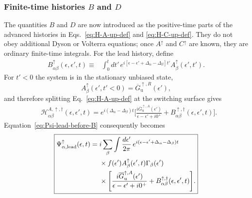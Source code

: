 \documentclass[
 reprint,
 superscriptaddress,
 amsmath,amssymb,
 aps,prb,
 longbibliography,
 floatfix
]{revtex4-2}
\begin{document}
\subsubsection{Finite-time histories $B$ and $D$}

The quantities $B$ and $D$ are now introduced as the positive-time parts of the advanced histories in Eqs.~\eqref{eq:H-A-up-def} and \eqref{eq:H-C-up-def}. They do not obey additional Dyson or Volterra equations; once $A^\uparrow$ and $C^\uparrow$ are known, they are ordinary finite-time integrals. For the lead history, define
\begin{equation*}
\begin{aligned}
B_{\alpha\beta}^\uparrow
(\epsilon,\epsilon',t)
\equiv{}&
\int_0^t dt'\,
e^{i[
\epsilon-\epsilon'
+\Delta_\alpha-\Delta_\beta]t'}
A_\beta^\uparrow(\epsilon',t').
\end{aligned}
\end{equation*}
For $t'<0$ the system is in the stationary unbiased state,
\begin{equation*}
A_\beta^\uparrow(\epsilon',t'<0)
=
\overline G_{\mathrm u}^{\uparrow,R}(\epsilon'),
\end{equation*}
and therefore splitting Eq.~\eqref{eq:H-A-up-def} at the switching surface gives
\begin{align*}
&\mathcal H_{\alpha\beta}^{A,\uparrow,\dagger}
(\epsilon,\epsilon',t)
=
e^{i(\Delta_\alpha-\Delta_\beta)t}
\Bigg[
\frac{
i\overline G_{\mathrm u}^{\uparrow,A}(\epsilon')}
{\epsilon-\epsilon'+i0^+}
+
B_{\alpha\beta}^{\uparrow,\dagger}
(\epsilon,\epsilon',t)
\Bigg].
\end{align*}
Equation~\eqref{eq:Psi-lead-before-B} consequently becomes
\begin{equation}
\boxed{
\begin{aligned}
\Psi_{\alpha,\rm lead}^\uparrow(\epsilon,t)
={}&
i\sum_\beta
\int\frac{d\epsilon'}{2\pi}\,
e^{i(
\epsilon-\epsilon'
+\Delta_\alpha-\Delta_\beta)t}
\\
&\times
f(\epsilon')
A_\beta^\uparrow(\epsilon',t)
\Gamma_\beta(\epsilon')
\\
&\times
\Bigg[
\frac{
i\overline G_{\mathrm u}^{\uparrow,A}(\epsilon')}
{\epsilon-\epsilon'+i0^+}
+
B_{\alpha\beta}^{\uparrow,\dagger}
(\epsilon,\epsilon',t)
\Bigg].
\end{aligned}}
\label{eq:Psi-lead-up-proof}
\end{equation}
\end{document}
